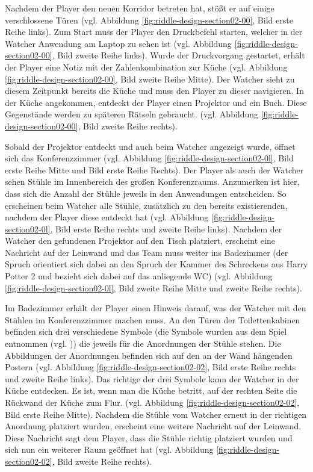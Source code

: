 Nachdem der Player den neuen Korridor betreten hat, stößt er auf einige verschlossene Türen (vgl. Abbildung \ref{fig:riddle-design-section02-00}, Bild erste Reihe links). Zum Start muss der Player den Druckbefehl starten, welcher in der Watcher Anwendung am Laptop zu sehen ist (vgl. Abbildung \ref{fig:riddle-design-section02-00}, Bild zweite Reihe links). Wurde der Druckvorgang gestartet, erhält der Player eine Notiz mit der Zahlenkombination zur Küche (vgl. Abbildung \ref{fig:riddle-design-section02-00}, Bild zweite Reihe Mitte). Der Watcher sieht zu diesem Zeitpunkt bereits die Küche und muss den Player zu dieser  navigieren. In der Küche angekommen, entdeckt der Player einen Projektor und ein Buch. Diese Gegenstände werden zu späteren Rätseln gebraucht. (vgl. Abbildung \ref{fig:riddle-design-section02-00}, Bild zweite Reihe rechts). 

Sobald der Projektor entdeckt und auch beim Watcher angezeigt wurde, öffnet sich das Konferenzzimmer (vgl. Abbildung \ref{fig:riddle-design-section02-0l}, Bild erste Reihe Mitte und Bild erste Reihe Rechts). Der Player als auch der Watcher sehen Stühle im Innenbereich des großen Konferenzraums. Anzumerken ist hier, dass sich die Anzahl der Stühle jeweils in den Anwendungen entscheiden. So erscheinen beim Watcher alle Stühle, zusätzlich zu den bereits existierenden, nachdem der Player diese entdeckt hat (vgl. Abbildung \ref{fig:riddle-design-section02-0l}, Bild erste Reihe rechts und zweite Reihe links). Nachdem der Watcher den gefundenen Projektor auf den Tisch platziert, erscheint eine Nachricht auf der Leinwand und das Team muss weiter ins Badezimmer (der Spruch  orientiert sich dabei an den Spruch der Kammer des Schreckens aus Harry Potter 2 und bezieht sich dabei auf das anliegende WC) (vgl. Abbildung \ref{fig:riddle-design-section02-0l}, Bild zweite Reihe Mitte und zweite Reihe rechts).

Im Badezimmer erhält der Player einen Hinweis darauf, was der Watcher mit den Stühlen im Konferenzzimmer machen muss. An den Türen der Toilettenkabinen befinden sich drei verschiedene Symbole (die Symbole wurden aus dem Spiel  entnommen (vgl. \cite{noauthor_we_nodate})) die jeweils für die Anordnungen der Stühle stehen. Die Abbildungen der Anordnungen befinden sich auf den an der Wand hängenden Postern (vgl. Abbildung \ref{fig:riddle-design-section02-02}, Bild erste Reihe rechts und zweite Reihe links). Das richtige der drei Symbole kann der Watcher in der Küche entdecken. Es ist, wenn man die Küche betritt, auf der rechten Seite die Rückwand der Küche zum Flur. (vgl. Abbildung \ref{fig:riddle-design-section02-02}, Bild erste Reihe Mitte). Nachdem die Stühle vom Watcher erneut in der richtigen Anordnung platziert wurden, erscheint eine weitere Nachricht auf der Leinwand.  Diese Nachricht sagt dem Player, dass die Stühle richtig platziert wurden und sich nun ein weiterer Raum geöffnet hat (vgl. Abbildung \ref{fig:riddle-design-section02-02}, Bild zweite Reihe rechts).


